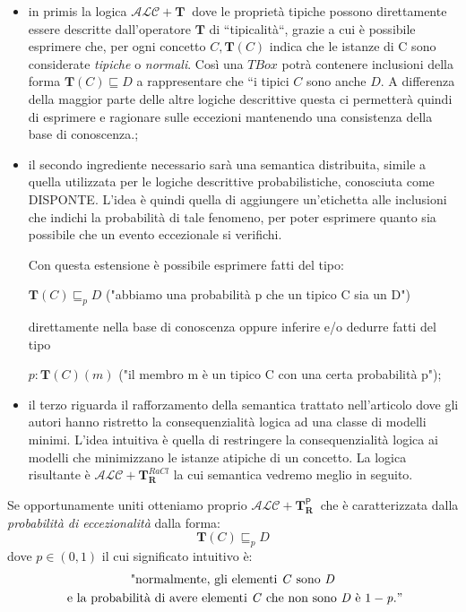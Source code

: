 \begin{itemize} \label{itemize: 3 comp}
	\item in primis la logica $\mathcal {ALC}+\mathbf{T}\ $ dove le proprietà tipiche possono 
	direttamente essere descritte dall'operatore $\mathbf{T}$ di “tipicalità“, grazie a cui
 è possibile esprimere che, per ogni concetto $\mathit{C},\mathbf{T}(\mathit{C})$ 
 indica che le istanze di C sono considerate \textit{tipiche} o \textit{normali}.
	Così una $\mathit{TBox}$ potrà contenere inclusioni della forma $\mathbf{T}(\mathit{C})\sqsubseteq \mathit{D}$ 
	a rappresentare che “i tipici $\mathit{C}$ sono anche $\mathit{D}$. A differenza della 
	maggior parte delle altre logiche descrittive questa ci permetterà quindi
	di esprimere e ragionare sulle eccezioni mantenendo una consistenza della base di conoscenza.\cite{DLExtension};
		
	\item il secondo ingrediente necessario sarà una semantica distribuita, simile 
	a quella utilizzata per le logiche descrittive probabilistiche, conosciuta come DISPONTE. 
	L’idea è quindi quella di aggiungere un’etichetta alle inclusioni che indichi la probabilità 
	di tale fenomeno, per poter esprimere quanto sia possibile che un evento eccezionale si verifichi.\par
	Con questa estensione è possibile esprimere fatti del tipo: \par 
	$ \mathbf{T}(\mathit{C})\sqsubseteq_{p} \mathit{D} $ ("abbiamo una probabilità p che un tipico C sia un D") \par 
	direttamente nella base di conoscenza oppure inferire e/o dedurre fatti del tipo 
	\par$ \mathit{p}:\mathbf{T}(\mathit{C})(\mathit{m})$ ("il membro m è un tipico C con una certa probabilità p")\cite{ProbOfEx};
		
	\item il terzo riguarda il rafforzamento della semantica trattato nell'articolo \cite{FromPLtoDL} 
	dove gli autori hanno ristretto la consequenzialità logica ad una classe di
	modelli minimi. L’idea intuitiva è quella di restringere la consequenzialità logica ai
	modelli che minimizzano le istanze atipiche di un concetto. 
	La logica risultante è $ \mathcal {ALC}+\mathbf{T}_\mathbf{R}^{ \mathit{RaCl}}$ la cui semantica vedremo meglio in seguito.
\end{itemize}
Se opportunamente uniti otteniamo proprio $\mathcal {ALC}+\mathbf{T}_\mathbf{R}^{ \textsf {P} }\ $ 
che è caratterizzata dalla \textit{probabilità di eccezionalità} dalla forma:
\[ \mathbf{T}(\mathit{C})\sqsubseteq_{p} \mathit{D} \]
dove $ \mathit{p} \in (0,1) $ il cui significato intuitivo è:
\begin{multline*}
\text{"normalmente, gli elementi } \mathit{C}  \text{ sono } \mathit{D} \\
\text{ e la probabilità di avere elementi } \mathit{C} 
\text{ che non sono } \mathit{D} \text{ è } 1 -\mathit{p}."
\end{multline*}

